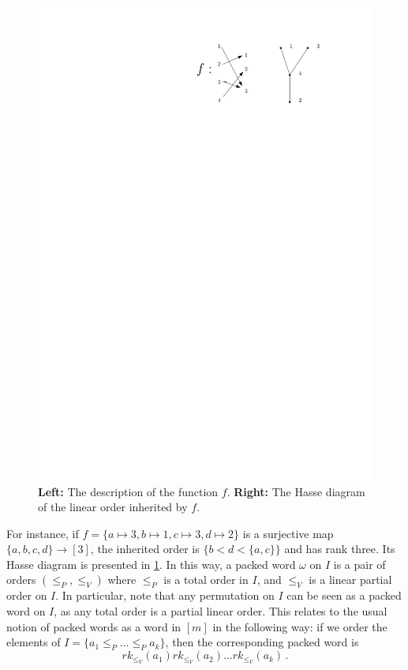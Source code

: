 \documentclass[12pt, reqno]{amsart}
\theoremstyle{definition}
\begin{document}
\begin{figure}[h]
	\centering
	\includegraphics[scale=1]{images/packedWordOrder.pdf}
	\caption{\textbf{Left:} The description of the function $f$. \textbf{Right:} The Hasse diagram of the linear order inherited by $f$. \label{fig:packedWordOrder}}
\end{figure}

For instance, if $f = \{ a\mapsto 3, b\mapsto 1, c\mapsto 3, d\mapsto 2\}$ is a surjective map $\{a, b, c, d\}\to[3]$, the inherited order is $\{b < d < \{a, c \}\}$ and has rank three.
Its Hasse diagram is presented in \cref{fig:packedWordOrder}.
In this way, a packed word $\omega$ on $I$ is a pair of orders $(\leq_P, \leq_V)$ where $\leq_P$ is a total order in $I$, and $\leq_V$ is a linear partial order on $I$.
In particular, note that any permutation on $I$ can be seen as a packed word on $I$, as any total order is a partial linear order.
This relates to the usual notion of packed words as a word in $[m]$ in the following way:
if we order the elements of $I = \{a_1 \leq_P \dots \leq_P a_k \}$, then the corresponding packed word is 
$$rk_{\leq_V}(a_1)rk_{\leq_V}(a_2) \dots rk_{\leq_V}(a_k) \, .$$
\end{document}

